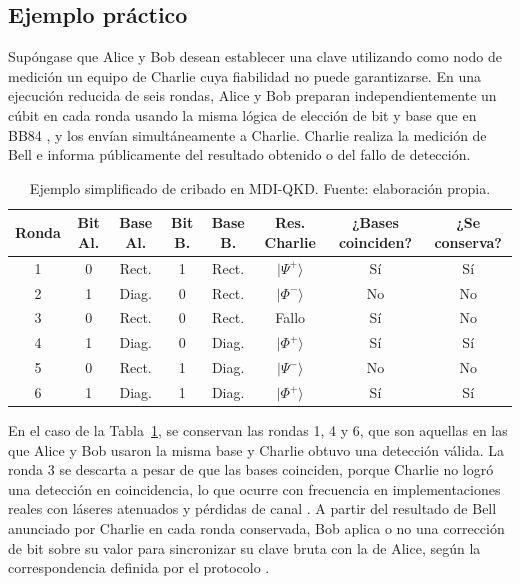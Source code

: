 \subsection{Ejemplo práctico}

Supóngase que Alice y Bob desean establecer una clave utilizando como nodo de medición un equipo de Charlie cuya fiabilidad no puede garantizarse. En una ejecución reducida de seis rondas, Alice y Bob preparan independientemente un cúbit en cada ronda usando la misma lógica de elección de bit y base que en BB84 \citep{bennett1984}, y los envían simultáneamente a Charlie. Charlie realiza la medición de Bell e informa públicamente del resultado obtenido o del fallo de detección.

\begin{table}[h]
    \centering
    \small
    \begin{tabular}{c c c c c c c c}
        \hline\hline
        Ronda & Bit Al. & Base Al. & Bit B. & Base B. & Res. Charlie & ¿Bases coinciden? & ¿Se conserva? \\
        \hline
        1 & 0 & Rect. & 1 & Rect. & $|\Psi^+\rangle$ & Sí  & Sí \\
        2 & 1 & Diag. & 0 & Rect. & $|\Phi^-\rangle$ & No  & No \\
        3 & 0 & Rect. & 0 & Rect. & Fallo            & Sí  & No \\
        4 & 1 & Diag. & 0 & Diag. & $|\Phi^+\rangle$ & Sí  & Sí \\
        5 & 0 & Rect. & 1 & Diag. & $|\Psi^-\rangle$ & No  & No \\
        6 & 1 & Diag. & 1 & Diag. & $|\Phi^+\rangle$ & Sí  & Sí \\
        \hline
    \end{tabular}
    \caption[Ejemplo de cribado en MDI-QKD]{Ejemplo simplificado de cribado en MDI-QKD. Fuente: elaboración propia.}
    \label{tab:mdiqkd_ejemplo}
\end{table}

En el caso de la Tabla~\ref{tab:mdiqkd_ejemplo}, se conservan las rondas 1, 4 y 6, que son aquellas en las que Alice y Bob usaron la misma base y Charlie obtuvo una detección válida. La ronda 3 se descarta a pesar de que las bases coinciden, porque Charlie no logró una detección en coincidencia, lo que ocurre con frecuencia en implementaciones reales con láseres atenuados y pérdidas de canal \citep{lo2012,curty2014}. A partir del resultado de Bell anunciado por Charlie en cada ronda conservada, Bob aplica o no una corrección de bit sobre su valor para sincronizar su clave bruta con la de Alice, según la correspondencia definida por el protocolo \citep{lo2012}.

